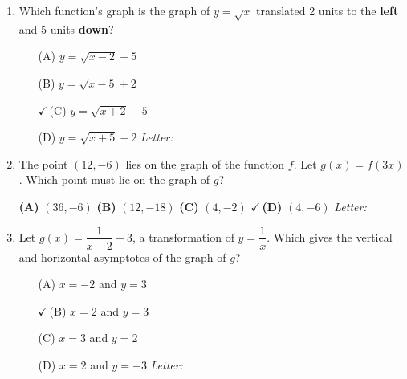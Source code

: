 \documentclass[10pt]{article}
\begin{document}
\begin{enumerate}[leftmargin=1.9em, itemsep=12pt]

\item Which function's graph is the graph of $y = \sqrt{x}$ translated 2 units to the
      \textbf{left} and 5 units \textbf{down}?

      \begin{enumerate}[leftmargin=2.6em, itemsep=2pt]
        \item[(A)] $y = \sqrt{x - 2} - 5$
        \item[(B)] $y = \sqrt{x - 5} + 2$
        \item[{\color{keyred}$\checkmark$\,(C)}] $y = \sqrt{x + 2} - 5$
        \item[(D)] $y = \sqrt{x + 5} - 2$ \hfill\textit{Letter:}~\gradedblank[id=ap1, type=choice, points=1, answer=C]{0.42in}{13pt}
      \end{enumerate}

\item The point $(12, -6)$ lies on the graph of the function $f$. Let $g(x) = f(3x)$. Which
      point must lie on the graph of $g$?

      \smallskip
      \textbf{(A)} $(36, -6)$ \hspace{2.2em} \textbf{(B)} $(12, -18)$ \hspace{2.2em} \textbf{(C)} $(4, -2)$ \hspace{2.2em} {\color{keyred}\textbf{$\checkmark$\,(D)}} $(4, -6)$ \hfill\textit{Letter:}~\gradedblank[id=ap2, type=choice, points=1, answer=D]{0.42in}{13pt}

\item Let $g(x) = \dfrac{1}{x - 2} + 3$, a transformation of $y = \dfrac{1}{x}$. Which gives the
      vertical and horizontal asymptotes of the graph of $g$?
      \begin{enumerate}[leftmargin=2.6em, itemsep=2pt]
        \item[(A)] $x = -2$ and $y = 3$
        \item[{\color{keyred}$\checkmark$\,(B)}] $x = 2$ and $y = 3$
        \item[(C)] $x = 3$ and $y = 2$
        \item[(D)] $x = 2$ and $y = -3$ \hfill\textit{Letter:}~\gradedblank[id=ap3, type=choice, points=1, answer=B]{0.42in}{13pt}
      \end{enumerate}


\end{enumerate}
\end{document}
